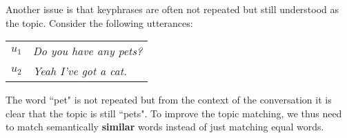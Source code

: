 Another issue is that \glspl{keyphrase} are often not repeated but still understood as the topic. Consider the following \glspl{utterance}:

\begin{table}[h]
    \begin{tabular}{l|l}
    $u_1$     & \textit{Do you have any pets?}                    \\
    $u_2$     & \textit{Yeah I've got a cat.}                        \\
    \end{tabular}
\end{table}
The word ``pet" is not repeated  but from the context of the conversation it is clear that the topic is still ``pets". To improve the topic matching, we thus need to match semantically \textbf{similar} words instead of just matching equal words.
